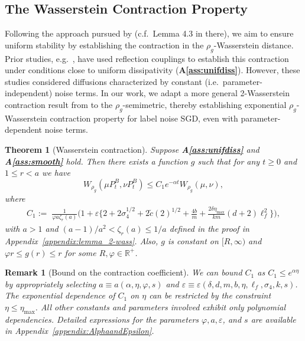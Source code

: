 \documentclass{article}
\newtheorem{theorem}{Theorem}
\newtheorem{remark}{Remark}
\begin{document}
\subsection{The Wasserstein Contraction Property}\label{sec:contraction}

Following the approach pursued by \citet{Farghly} (c.f.\ Lemma 4.3 in there), we aim to ensure uniform stability by establishing the contraction in the $\rho_g$-Wasserstein distance.
Prior studies, e.g.~\citep{Eberle,Farghly}, have used reflection couplings to establish this contraction under conditions close to uniform dissipativity (\textbf{A\ref{ass:unifdiss}}). However, these studies considered diffusions characterized by constant (i.e.\ parameter-independent) noise terms. In our work, we adapt a more general 2-Wasserstein contraction result from \citet{Wang} to the $\rho_g$-semimetric, thereby establishing exponential $\rho_g$-Wasserstein contraction property for label noise SGD, even with parameter-dependent noise terms.

\begin{theorem}[Wasserstein contraction]\label{thm:contraction}
    Suppose \textbf{A\ref{ass:unifdiss}} and \textbf{A\ref{ass:smooth}} hold. Then there exists a function $g$ such that for any $t \geq 0$ and $1\leq r < a$ we have
    $$W_{\rho_g}(\mu P_t^B, \nu P_t^B) \leq C_1 e^{-\alpha t} W_{\rho_g} (\mu, \nu),$$
    where \begin{align*}
        C_1 :=\;\frac{1}{\varphi a\zeta_r(a)} \bigg(1 + \varepsilon \bigg\{ 2 + 2\sigma_4^{1/2} +2\tilde{c}(2)^{1/2} + \frac{4b}{m} + \frac{2\delta \eta_{\max}}{km} (d +2) \ell_f^2 \bigg\}\bigg),
    \end{align*}
    with $a > 1$ and $(a-1)/a^2 < \zeta_r(a) \leq 1/a$ defined in the proof in Appendix~\ref{appendix:lemma_2-wass}.
    Also, $g$ is constant on $[R, \infty)$ and $\varphi r \leq g(r) \leq r$ for some $R, \varphi \in \mathbb{R}^+$.
\end{theorem}

\begin{remark}[Bound on the contraction coefficient]\label{remark:convergence}
    We can bound $C_1$ as $C_1 \leq e^{\alpha \eta}$ by appropriately selecting $a \equiv a(\alpha, \eta, \varphi, s)$ and $\varepsilon \equiv \varepsilon(\delta, d, m, b, \eta, \ell_f, \sigma_4, k, s)$.  The exponential dependence of $C_1$ on $\eta$ can be restricted by the constraint $\eta \leq \eta_{\max}$. All other constants and parameters involved exhibit only polynomial dependencies. Detailed expressions for the parameters $\varphi, a, \varepsilon$, and $s$ are available in Appendix~\ref{appendix:AlphaandEpsilon}.
\end{remark}
\end{document}
